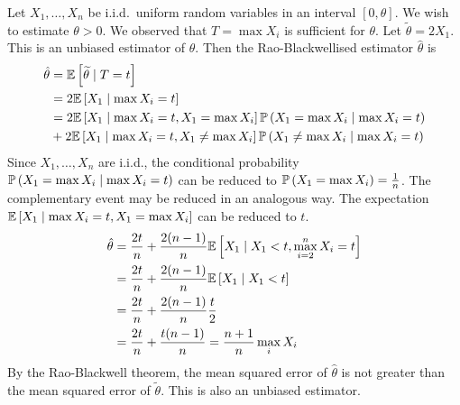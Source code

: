 \begin{example}
	Let \( X_1, \dots, X_n \) be i.i.d.\ uniform random variables in an interval \( [0, \theta] \).
	We wish to estimate \( \theta > 0 \).
	We observed that \( T = \max X_i \) is sufficient for \( \theta \).
	Let \( \widetilde \theta = 2 X_1 \).
	This is an unbiased estimator of \( \theta \).
	Then the Rao-Blackwellised estimator \( \hat \theta \) is
	\begin{align*}
		\hat \theta & = \mathbb{E}\left[{\widetilde \theta \mid T = t}\right]                                                          \\
		            & = 2 \mathbb{E}\left[{X_1 \mid \max X_i = t}\right]                                                               \\
		            & = 2 \mathbb{E}\left[{X_1 \mid \max X_i = t, X_1 = \max X_i}\right] \mathbb{P}\left({X_1 = \max X_i \mid \max X_i = t}\right)       \\
		            & + 2 \mathbb{E}\left[{X_1 \mid \max X_i = t, X_1 \neq \max X_i}\right] \mathbb{P}\left({X_1 \neq \max X_i \mid \max X_i = t}\right) \\
	\end{align*}
	Since \( X_1, \dots, X_n \) are i.i.d., the conditional probability \( \mathbb{P}\left({X_1 = \max X_i \mid \max X_i = t}\right) \) can be reduced to \( \mathbb{P}\left({X_1 = \max X_i}\right) = \frac{1}{n} \).
	The complementary event may be reduced in an analogous way.
	The expectation \( \mathbb{E}\left[{X_1 \mid \max X_i = t, X_1 = \max X_i}\right] \) can be reduced to \( t \).
	\begin{align*}
		\hat \theta & = \frac{2t}{n} + \frac{2(n-1)}{n} \mathbb{E}\left[{X_1 \mid X_1 < t, \max_{i=2}^n X_i = t}\right] \\
		            & = \frac{2t}{n} + \frac{2(n-1)}{n} \mathbb{E}\left[{X_1 \mid X_1 < t}\right]                       \\
		            & = \frac{2t}{n} + \frac{2(n-1)}{n} \frac{t}{2}                                     \\
		            & = \frac{2t}{n} + \frac{t(n-1)}{n} = \frac{n+1}{n} \max_i X_i
	\end{align*}
	By the Rao-Blackwell theorem, the mean squared error of \( \hat \theta \) is not greater than the mean squared error of \( \widetilde \theta \).
	This is also an unbiased estimator.
\end{example}

